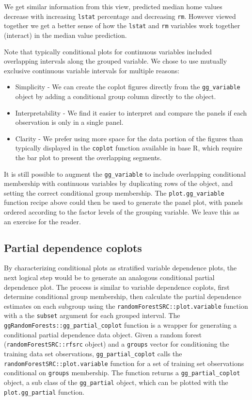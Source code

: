 \documentclass[article]{jss}
\begin{document}
We get similar information from this view, predicted median home values
decrease with increasing \texttt{lstat} percentage and decreasing
\texttt{rm}. However viewed together we get a better sense of how the
\texttt{lstat} and \texttt{rm} variables work together (interact) in the
median value prediction.

Note that typically \citep{cleveland:1993} conditional plots for
continuous variables included overlapping intervals along the grouped
variable. We chose to use mutually exclusive continuous variable
intervals for multiple reasons:

\begin{itemize}
\item
  Simplicity - We can create the coplot figures directly from the
  \texttt{gg\_variable} object by adding a conditional group column
  directly to the object.
\item
  Interpretability - We find it easier to interpret and compare the
  panels if each observation is only in a single panel.
\item
  Clarity - We prefer using more space for the data portion of the
  figures than typically displayed in the \texttt{coplot} function
  available in base R, which require the bar plot to present the
  overlapping segments.
\end{itemize}

It is still possible to augment the \texttt{gg\_variable} to include
overlapping conditional membership with continuous variables by
duplicating rows of the object, and setting the correct conditional
group membership. The \texttt{plot.gg\_variable} function recipe above
could then be used to generate the panel plot, with panels ordered
according to the factor levels of the grouping variable. We leave this
as an exercise for the reader.

\hypertarget{partial-dependence-coplots}{%
\subsection{Partial dependence
coplots}\label{partial-dependence-coplots}}

By characterizing conditional plots as stratified variable dependence
plots, the next logical step would be to generate an analogous
conditional partial dependence plot. The process is similar to variable
dependence coplots, first determine conditional group membership, then
calculate the partial dependence estimates on each subgroup using the
\texttt{randomForestSRC::plot.variable} function with a the
\texttt{subset} argument for each grouped interval. The
\texttt{ggRandomForests::gg\_partial\_coplot} function is a wrapper for
generating a conditional partial dependence data object. Given a random
forest (\texttt{randomForestSRC::rfsrc} object) and a \texttt{groups}
vector for conditioning the training data set observations,
\texttt{gg\_partial\_coplot} calls the
\texttt{randomForestSRC::plot.variable} function for a set of training
set observations conditional on \texttt{groups} membership. The function
returns a \texttt{gg\_partial\_coplot} object, a sub class of the
\texttt{gg\_partial} object, which can be plotted with the
\texttt{plot.gg\_partial} function.
\end{document}
